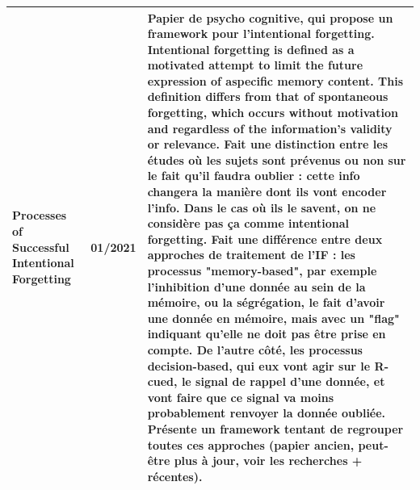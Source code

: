 \documentclass[french]{article}
\begin{document}
\begin{table}[ht!]
\begin{center}
\begin{tabular}{|p{}|p{}|p{}|}
            Processes of Successful Intentional Forgetting \cite{johnson_processes_1994}
            & 01/2021
            & Papier de psycho cognitive, qui propose un framework pour l'intentional forgetting. Intentional forgetting is defined as a motivated attempt to limit the future expression of aspecific memory content. This definition differs from that of spontaneous forgetting, which occurs without motivation and regardless of the information's validity or relevance.
            Fait une distinction entre les études où les sujets sont prévenus ou non sur le fait qu'il faudra oublier : cette info changera la manière dont ils vont encoder l'info. Dans le cas où ils le savent, on ne considère pas ça comme intentional forgetting.
            Fait une différence entre deux approches de traitement de l'IF : les processus "memory-based", par exemple l'inhibition d'une donnée au sein de la mémoire, ou la ségrégation, le fait d'avoir une donnée en mémoire, mais avec un "flag" indiquant qu'elle ne doit pas être prise en compte. De l'autre côté, les processus decision-based, qui eux vont agir sur le R-cued, le signal de rappel d'une donnée, et vont faire que ce signal va moins probablement renvoyer la donnée oubliée. Présente un framework tentant de regrouper toutes ces approches (papier ancien, peut-être plus à jour, voir les recherches + récentes).

            \\
            \hline


\end{tabular}
\end{center}
\end{table}
\end{document}
